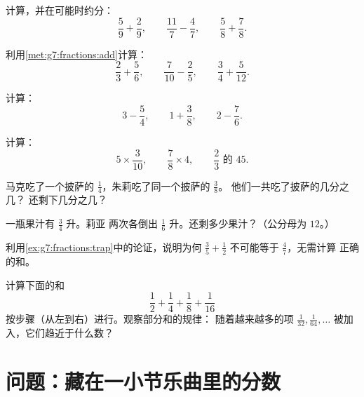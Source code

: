 \begin{exercise}[$\star$]\label{exo:g7:fractions:5}
计算，并在可能时约分：
\[
\frac{5}{9} + \frac{2}{9}, \qquad
\frac{11}{7} - \frac{4}{7}, \qquad
\frac{5}{8} + \frac{7}{8} .
\]
\end{exercise}

\begin{exercise}[$\star$]\label{exo:g7:fractions:6}
利用\cref{met:g7:fractions:add}计算：
\[
\frac{2}{3} + \frac{5}{6}, \qquad
\frac{7}{10} - \frac{2}{5}, \qquad
\frac{3}{4} + \frac{5}{12} .
\]
\end{exercise}

\begin{exercise}[$\star$]\label{exo:g7:fractions:7}
计算：
\[
3 - \frac{5}{4}, \qquad
1 + \frac{3}{8}, \qquad
2 - \frac{7}{6} .
\]
\end{exercise}

\begin{exercise}[$\star$]\label{exo:g7:fractions:8}
计算：
\[
5 \times \frac{3}{10}, \qquad
\frac{7}{8} \times 4, \qquad
\frac{2}{3} \text{ 的 } 45 .
\]
\end{exercise}

\begin{exercise}[$\star\star$]\label{exo:g7:fractions:9}
马克吃了一个披萨的 $\frac14$，朱莉吃了同一个披萨的 $\frac38$。
他们一共吃了披萨的几分之几？
还剩下几分之几？
\end{exercise}

\begin{exercise}[$\star\star$]\label{exo:g7:fractions:10}
一瓶果汁有 $\frac34$ 升。莉亚
两次各倒出 $\frac16$ 升。还剩多少果汁？（公分母为 $12$。）
\end{exercise}

\begin{exercise}[$\star\star$]\label{exo:g7:fractions:11}
利用\cref{ex:g7:fractions:trap}中的论证，说明为何
$\frac35 + \frac12$ 不可能等于 $\frac{4}{7}$，无需计算
正确的和。
\end{exercise}

\begin{exercise}[$\star\star\star$]\label{exo:g7:fractions:12}
计算下面的和
\[
\frac12 + \frac14 + \frac18 + \frac{1}{16}
\]
按步骤（从左到右）进行。观察部分和的规律：
随着越来越多的项
$\frac{1}{32}, \frac{1}{64}, \dots$ 被加入，它们趋近于什么数？
\end{exercise}

\section{问题：藏在一小节乐曲里的分数}

